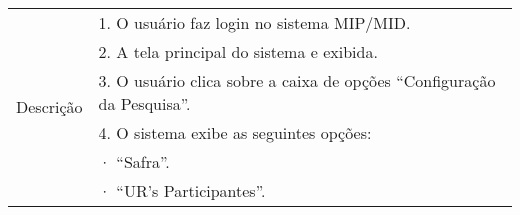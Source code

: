 \begin{table}[!h]
\begin{tabular}{|l|l|}
\multirow{8}{*}{Descrição}                               & 1. O usuário faz login no sistema MIP/MID.                                                                                                                                                                                                                                                                                                                                               \\ \cline{2-2} 
                                                         & 2. A tela principal do sistema e exibida.                                                                                                                                                                                                                                                                                                                                                \\ \cline{2-2} 
                                                         & 3. O usuário clica sobre a caixa de opções “Configuração da Pesquisa”.                                                                                                                                                                                                                                                                                                                   \\ \cline{2-2} 
                                                         & 4. O sistema exibe as seguintes opções:                                                                                                                                                                                                                                                                                                                                                  \\ \cline{2-2} 
                                                         & ·         “Safra”.                                                                                                                                                                                                                                                                                                                                                                       \\ \cline{2-2} 
                                                         & ·         “UR’s Participantes”.                                                                                                                                                                                                                                                                                                                                                          \\ \cline{2-2} 

\end{tabular}
\end{table}
